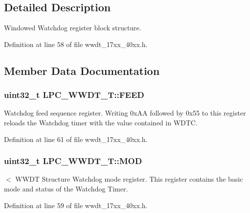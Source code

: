 \subsection{Detailed Description}
Windowed Watchdog register block structure. 

Definition at line 58 of file wwdt\+\_\+17xx\+\_\+40xx.\+h.



\subsection{Member Data Documentation}
\subsubsection[{\texorpdfstring{F\+E\+ED}{FEED}}]{ uint32\+\_\+t L\+P\+C\+\_\+\+W\+W\+D\+T\+\_\+\+T\+::\+F\+E\+ED}\hypertarget{structLPC__WWDT__T_a80b357a30f90ba82fd46ff1faa8fe4b8}{}\label{structLPC__WWDT__T_a80b357a30f90ba82fd46ff1faa8fe4b8}
Watchdog feed sequence register. Writing 0x\+AA followed by 0x55 to this register reloads the Watchdog timer with the value contained in W\+D\+TC. 

Definition at line 61 of file wwdt\+\_\+17xx\+\_\+40xx.\+h.

\subsubsection[{\texorpdfstring{M\+OD}{MOD}}]{ uint32\+\_\+t L\+P\+C\+\_\+\+W\+W\+D\+T\+\_\+\+T\+::\+M\+OD}\hypertarget{structLPC__WWDT__T_a92ea6cd2032ed81f7c5f626b48c4c772}{}\label{structLPC__WWDT__T_a92ea6cd2032ed81f7c5f626b48c4c772}
$<$ W\+W\+DT Structure Watchdog mode register. This register contains the basic mode and status of the Watchdog Timer. 

Definition at line 59 of file wwdt\+\_\+17xx\+\_\+40xx.\+h.

